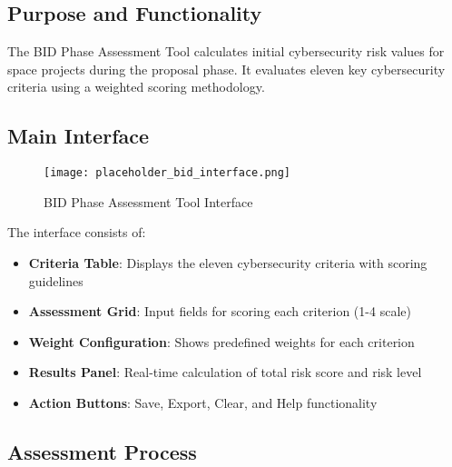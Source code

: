 \documentclass[binding=0.6cm]{sapthesis}
\begin{document}
\subsection{Purpose and Functionality}

The BID Phase Assessment Tool calculates initial cybersecurity risk values for space projects during the proposal phase. It evaluates eleven key cybersecurity criteria using a weighted scoring methodology.

\subsection{Main Interface}

\begin{figure}[H]
    \centering
    \texttt{[image: placeholder\_bid\_interface.png]}
    \caption{BID Phase Assessment Tool Interface}
    \label{fig:bid_interface}
\end{figure}

The interface consists of:
\begin{itemize}
    \item \textbf{Criteria Table}: Displays the eleven cybersecurity criteria with scoring guidelines
    \item \textbf{Assessment Grid}: Input fields for scoring each criterion (1-4 scale)
    \item \textbf{Weight Configuration}: Shows predefined weights for each criterion
    \item \textbf{Results Panel}: Real-time calculation of total risk score and risk level
    \item \textbf{Action Buttons}: Save, Export, Clear, and Help functionality
\end{itemize}

\subsection{Assessment Process}
\end{document}
